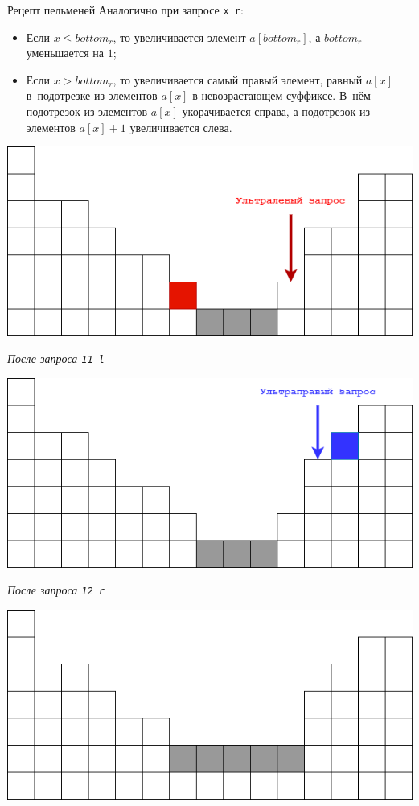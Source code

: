\begin{tutorial}{Рецепт пельменей}
Аналогично при запросе \texttt{x r}:
\begin{itemize}
  \item Если $x \le bottom_r$, то увеличивается элемент $a[bottom_r]$, а $bottom_r$ уменьшается на $1$;
  \item Если $x > bottom_r$, то увеличивается самый правый элемент, равный $a[x]$ в~подотрезке из элементов $a[x]$ в невозрастающем суффиксе. В~нём подотрезок из элементов $a[x]$ укорачивается справа, а подотрезок из элементов $a[x] + 1$ увеличивается слева.
\end{itemize}

\begin{center}
  \includegraphics [width=.95\textwidth] {2.png}

  \textit{После запроса \texttt{11 l}}
\end{center}

\begin{center}
  \includegraphics [width=.95\textwidth] {3.png}

  \textit{После запроса \texttt{12 r}}
\end{center}


\begin{center}
  \includegraphics [width=.95\textwidth] {4.png}


\end{center}
\end{tutorial}
